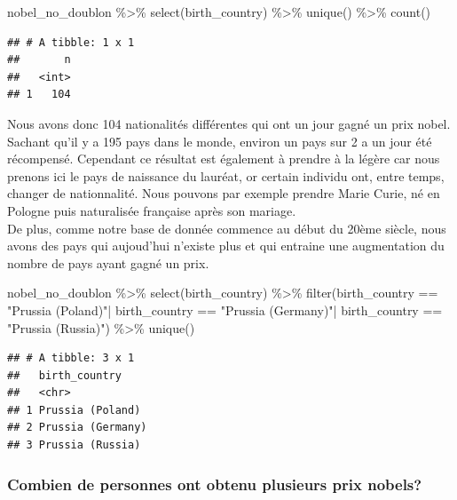 \documentclass[
]{article}
\newenvironment{Shaded}{\begin{snugshade}}{\end{snugshade}}
\newcommand{\FunctionTok}[1]{\textcolor[rgb]{0.00,0.00,0.00}{#1}}
\newcommand{\NormalTok}[1]{#1}
\newcommand{\SpecialCharTok}[1]{\textcolor[rgb]{0.00,0.00,0.00}{#1}}
\newcommand{\StringTok}[1]{\textcolor[rgb]{0.31,0.60,0.02}{#1}}
\begin{document}
\begin{Shaded}
\begin{Highlighting}[]
\NormalTok{nobel\_no\_doublon }\SpecialCharTok{\%\textgreater{}\%} 
  \FunctionTok{select}\NormalTok{(birth\_country) }\SpecialCharTok{\%\textgreater{}\%} 
  \FunctionTok{unique}\NormalTok{() }\SpecialCharTok{\%\textgreater{}\%} 
  \FunctionTok{count}\NormalTok{()}
\end{Highlighting}
\end{Shaded}

\begin{verbatim}
## # A tibble: 1 x 1
##       n
##   <int>
## 1   104
\end{verbatim}

Nous avons donc 104 nationalités différentes qui ont un jour gagné un
prix nobel. Sachant qu'il y a 195 pays dans le monde, environ un pays
sur 2 a un jour été récompensé. Cependant ce résultat est également à
prendre à la légère car nous prenons ici le pays de naissance du
lauréat, or certain individu ont, entre temps, changer de nationnalité.
Nous pouvons par exemple prendre Marie Curie, né en Pologne puis
naturalisée française après son mariage.\\
De plus, comme notre base de donnée commence au début du 20ème siècle,
nous avons des pays qui aujoud'hui n'existe plus et qui entraine une
augmentation du nombre de pays ayant gagné un prix.

\begin{Shaded}
\begin{Highlighting}[]
\NormalTok{nobel\_no\_doublon }\SpecialCharTok{\%\textgreater{}\%} 
  \FunctionTok{select}\NormalTok{(birth\_country) }\SpecialCharTok{\%\textgreater{}\%} 
  \FunctionTok{filter}\NormalTok{(birth\_country }\SpecialCharTok{==} \StringTok{"Prussia (Poland)"}\SpecialCharTok{|}\NormalTok{ birth\_country }\SpecialCharTok{==} \StringTok{"Prussia (Germany)"}\SpecialCharTok{|}\NormalTok{ birth\_country }\SpecialCharTok{==} \StringTok{"Prussia (Russia)"}\NormalTok{) }\SpecialCharTok{\%\textgreater{}\%}  
  \FunctionTok{unique}\NormalTok{()}
\end{Highlighting}
\end{Shaded}

\begin{verbatim}
## # A tibble: 3 x 1
##   birth_country    
##   <chr>            
## 1 Prussia (Poland) 
## 2 Prussia (Germany)
## 3 Prussia (Russia)
\end{verbatim}

\hypertarget{combien-de-personnes-ont-obtenu-plusieurs-prix-nobels}{%
\subsubsection{\texorpdfstring{\textbf{Combien de personnes ont obtenu
plusieurs prix
nobels?}}{Combien de personnes ont obtenu plusieurs prix nobels?}}\label{combien-de-personnes-ont-obtenu-plusieurs-prix-nobels}}
\end{document}
